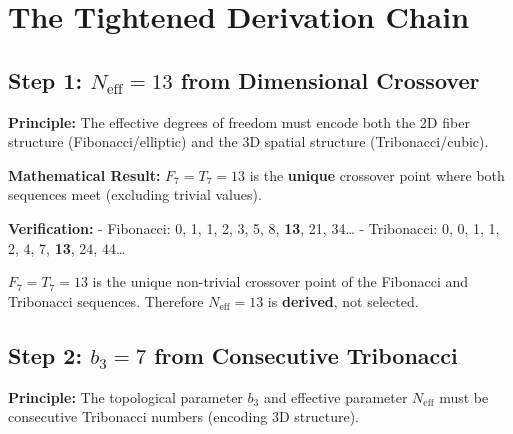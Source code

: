 \documentclass[
  11pt,
  letterpaper,
  twoside,
  openright]{book}
\begin{document}
\section{The Tightened Derivation
Chain}\label{the-tightened-derivation-chain}

\subsection{\texorpdfstring{Step 1: \(N_{\text{eff}} = 13\) from
Dimensional
Crossover}{Step 1: N\_\{\textbackslash text\{eff\}\} = 13 from Dimensional Crossover}}\label{step-1-n_texteff-13-from-dimensional-crossover}

\textbf{Principle:} The effective degrees of freedom must encode both
the 2D fiber structure (Fibonacci/elliptic) and the 3D spatial structure
(Tribonacci/cubic).

\textbf{Mathematical Result:} \(F_7 = T_7 = 13\) is the \textbf{unique}
crossover point where both sequences meet (excluding trivial values).

\textbf{Verification:} - Fibonacci: 0, 1, 1, 2, 3, 5, 8, \textbf{13},
21, 34\ldots{} - Tribonacci: 0, 0, 1, 1, 2, 4, 7, \textbf{13}, 24,
44\ldots{}

\begin{tcolorbox}[enhanced jigsaw, coltitle=black, colbacktitle=quarto-callout-note-color!10!white, toprule=.15mm, colframe=quarto-callout-note-color-frame, arc=.35mm, opacityback=0, bottomtitle=1mm, toptitle=1mm, breakable, colback=white, titlerule=0mm, opacitybacktitle=0.6, title=\textcolor{quarto-callout-note-color}{\faInfo}\hspace{0.5em}{Theorem NTHR-4}, rightrule=.15mm, bottomrule=.15mm, leftrule=.75mm, left=2mm]

\(F_7 = T_7 = 13\) is the unique non-trivial crossover point of the
Fibonacci and Tribonacci sequences. Therefore \(N_{\text{eff}} = 13\) is
\textbf{derived}, not selected.

\end{tcolorbox}

\subsection{\texorpdfstring{Step 2: \(b_3 = 7\) from Consecutive
Tribonacci}{Step 2: b\_3 = 7 from Consecutive Tribonacci}}\label{step-2-b_3-7-from-consecutive-tribonacci}

\textbf{Principle:} The topological parameter \(b_3\) and effective
parameter \(N_{\text{eff}}\) must be consecutive Tribonacci numbers
(encoding 3D structure).
\end{document}
